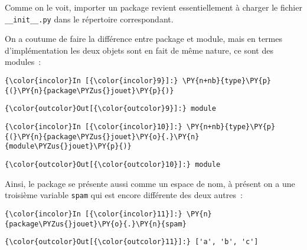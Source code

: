 Comme on le voit, importer un package revient essentiellement à charger
le fichier \texttt{\_\_init\_\_.py} dans le répertoire correspondant.

    On a coutume de faire la différence entre package et module, mais en
termes d'implémentation les deux objets sont en fait de même nature, ce
sont des modules~:

    \begin{Verbatim}[commandchars=\\\{\},frame=single,framerule=0.3mm,rulecolor=\color{cellframecolor}]
{\color{incolor}In [{\color{incolor}9}]:} \PY{n+nb}{type}\PY{p}{(}\PY{n}{package\PYZus{}jouet}\PY{p}{)}
\end{Verbatim}


\begin{Verbatim}[commandchars=\\\{\},frame=single,framerule=0.3mm,rulecolor=\color{cellframecolor}]
{\color{outcolor}Out[{\color{outcolor}9}]:} module
\end{Verbatim}
            
    \begin{Verbatim}[commandchars=\\\{\},frame=single,framerule=0.3mm,rulecolor=\color{cellframecolor}]
{\color{incolor}In [{\color{incolor}10}]:} \PY{n+nb}{type}\PY{p}{(}\PY{n}{package\PYZus{}jouet}\PY{o}{.}\PY{n}{module\PYZus{}jouet}\PY{p}{)}
\end{Verbatim}


\begin{Verbatim}[commandchars=\\\{\},frame=single,framerule=0.3mm,rulecolor=\color{cellframecolor}]
{\color{outcolor}Out[{\color{outcolor}10}]:} module
\end{Verbatim}
            
    Ainsi, le package se présente aussi comme un espace de nom, à présent on
a une troisième variable \texttt{spam} qui est encore différente des
deux autres~:

    \begin{Verbatim}[commandchars=\\\{\},frame=single,framerule=0.3mm,rulecolor=\color{cellframecolor}]
{\color{incolor}In [{\color{incolor}11}]:} \PY{n}{package\PYZus{}jouet}\PY{o}{.}\PY{n}{spam}
\end{Verbatim}


\begin{Verbatim}[commandchars=\\\{\},frame=single,framerule=0.3mm,rulecolor=\color{cellframecolor}]
{\color{outcolor}Out[{\color{outcolor}11}]:} ['a', 'b', 'c']
\end{Verbatim}
            
